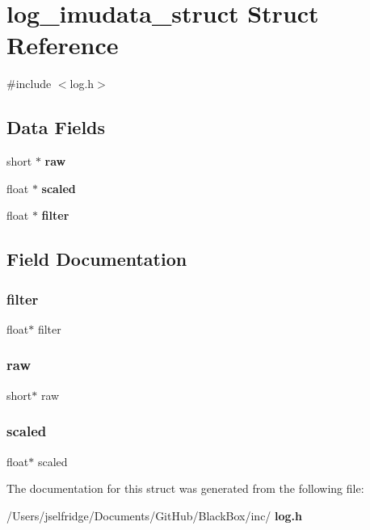 \section{log\+\_\+imudata\+\_\+struct Struct Reference}
\label{structlog__imudata__struct}


{\ttfamily \#include $<$log.\+h$>$}

\subsection*{Data Fields}
\begin{DoxyCompactItemize}
\item 
short $\ast$ \textbf{ raw}
\item 
float $\ast$ \textbf{ scaled}
\item 
float $\ast$ \textbf{ filter}
\end{DoxyCompactItemize}


\subsection{Field Documentation}
\mbox{\label{structlog__imudata__struct_aa6bfca5b19e1a327298380a46ff10893}} 
\subsubsection{filter}
{\footnotesize\ttfamily float$\ast$ filter}

\mbox{\label{structlog__imudata__struct_a4d8d1464fb31fe1aa2d4d352ce66d21d}} 
\subsubsection{raw}
{\footnotesize\ttfamily short$\ast$ raw}

\mbox{\label{structlog__imudata__struct_a56bf43aa62bf4e724f09b26b9a35351a}} 
\subsubsection{scaled}
{\footnotesize\ttfamily float$\ast$ scaled}



The documentation for this struct was generated from the following file\+:\begin{DoxyCompactItemize}
\item 
/\+Users/jselfridge/\+Documents/\+Git\+Hub/\+Black\+Box/inc/\textbf{ log.\+h}\end{DoxyCompactItemize}

